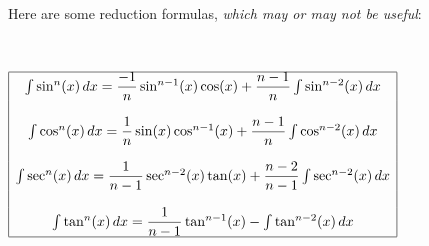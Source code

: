 \documentclass[12pt, oneside]{article}   	%
\begin{document}
\begin{enumerate}
Here are some reduction formulas, \emph{which may or may not be useful}:

\

\begin{center}
$ \begin{array}{| c |}
\hline
\int \sin^n(x) \, dx= \dfrac{-1}{n}\sin^{n-1}(x) \cos(x) + \dfrac{n-1}{n} \int \sin^{n-2}(x) \, dx \\
\\
\int \cos^n (x) \, dx= \dfrac{1}{n} \sin(x) \cos^{n-1}(x) + \dfrac{n-1}{n} \int \cos^{n-2}(x) \, dx \\
\\
\int \sec^n(x) \, dx= \dfrac{1}{n-1}  \sec^{n-2}(x) \tan(x) + \dfrac{n-2}{n-1} \int \sec^{n-2}(x) \, dx \\
\\ \int \tan^n(x) \,dx= \dfrac{1}{n-1} \tan^{n-1}(x)- \int \tan^{n-2}(x) \, dx \\
\hline
\end{array}$
\end{center}



\end{enumerate}
\end{document}

